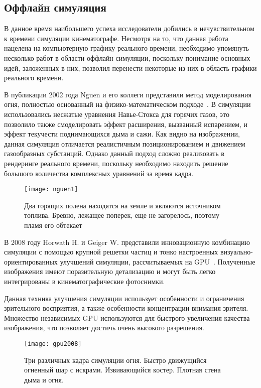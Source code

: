 \subsection{Оффлайн симуляция}
В данное время наибольшего успеха исследователи добились в нечувствительном к
времени симуляции кинематографе. Несмотря на то, что данная работа нацелена на
компьютерную графику реального времени, необходимо упомянуть несколько работ в
области оффлайн симуляции, поскольку понимание основных идей, заложенных в них,
позволил перенести некоторые из них в область графики реального времени.

В публикации 2002 года Nguen и его коллеги представили метод моделирования огня,
полностью основанный на физико-математическом подходе~\cite{nguen2002}. В
симуляции использовались несжатые уравнения Навье-Стокса для горячих газов, это
позволило также смоделировать эффект расширения, вызванный испарением, и эффект
текучести поднимающихся дыма и сажи. Как видно на изображении, данная симуляция
отличается реалистичным позиционированием и движением газообразных субстанций.
Однако данный подход сложно реализовать в рендеринге реального времени,
поскольку необходимо находить решение большого количества комплексных уравнений
за время кадра.
\begin{figure}[htb]
	\centering
	\texttt{[image: nguen1]}
	\caption{Два горящих полена находятся на земле и являются источником
 топлива. Бревно, лежащее поперек, еще не загорелось, поэтому пламя его обтекает}
\end{figure}

В 2008 году Horwath H. и Geiger W. представили инновационную комбинацию
симуляции с помощью крупной решетки частиц и тонко настроенных
визуально-ориентированных улучшений симуляции, рассчитываемых на
GPU~\cite{Stock:2008:SWF:1400385.1400457}. Полученные
изображения имеют поразительную детализацию и могут быть легко интегрированы в
кинематографические фотоснимки.

Данная техника улучшения симуляции использует особенности и ограничения
зрительного восприятия, а также особенности концентрации внимания зрителя.
Множество независимых GPU используются для быстрого увеличения качества
изображения, что позволяет достичь очень высокого разрешения.
\begin{figure}[htb]
	\centering
	\texttt{[image: gpu2008]}
	\caption{Три различных кадра симуляции огня. Быстро движущийся огненный
	шар с искрами. Извивающийся костер. Плотная стена дыма и огня.}
\end{figure}

